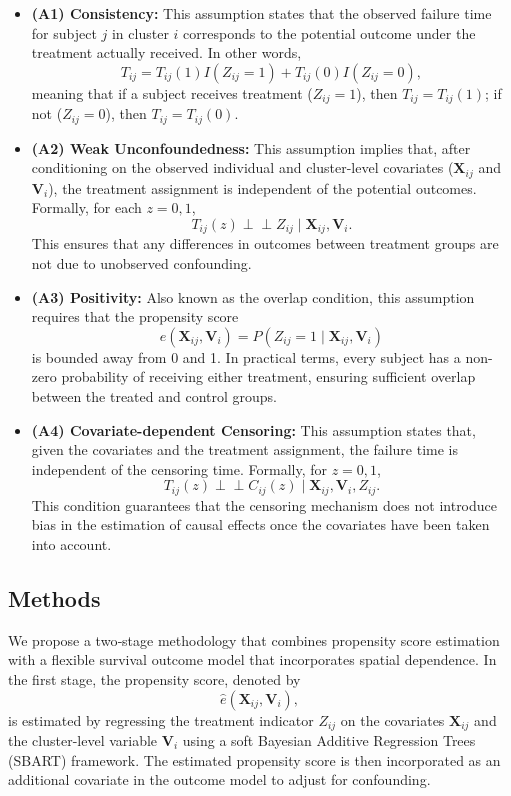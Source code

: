 \documentclass[useAMS,referee]{biom}
\begin{document}
\begin{itemize}
    \item \textbf{(A1) Consistency:} This assumption states that the observed failure time for subject \(j\) in cluster \(i\) corresponds to the potential outcome under the treatment actually received. In other words,
    \[
    T_{ij} = T_{ij}(1)I(Z_{ij}=1) + T_{ij}(0)I(Z_{ij}=0),
    \]
    meaning that if a subject receives treatment (\(Z_{ij}=1\)), then \(T_{ij} = T_{ij}(1)\); if not (\(Z_{ij}=0\)), then \(T_{ij} = T_{ij}(0)\).
    
    \item \textbf{(A2) Weak Unconfoundedness:} This assumption implies that, after conditioning on the observed individual and cluster-level covariates (\(\bm{X}_{ij}\) and \(\bm{V}_i\)), the treatment assignment is independent of the potential outcomes. Formally, for each \(z=0,1\),
    \[
    T_{ij}(z) \perp\!\!\!\perp Z_{ij}\mid \bm{X}_{ij},\bm{V}_i.
    \]
    This ensures that any differences in outcomes between treatment groups are not due to unobserved confounding.
    
    \item \textbf{(A3) Positivity:} Also known as the overlap condition, this assumption requires that the propensity score
    \[
    e(\bm{X}_{ij},\bm{V}_i)=P(Z_{ij}=1\mid \bm{X}_{ij},\bm{V}_i)
    \]
    is bounded away from 0 and 1. In practical terms, every subject has a non-zero probability of receiving either treatment, ensuring sufficient overlap between the treated and control groups.
    
    \item \textbf{(A4) Covariate-dependent Censoring:} This assumption states that, given the covariates and the treatment assignment, the failure time is independent of the censoring time. Formally, for \(z=0,1\),
    \[
    T_{ij}(z) \perp\!\!\!\perp C_{ij}(z)\mid \bm{X}_{ij},\bm{V}_i,Z_{ij}.
    \]
    This condition guarantees that the censoring mechanism does not introduce bias in the estimation of causal effects once the covariates have been taken into account.
\end{itemize}
 

\subsection{Methods}

We propose a two‐stage methodology that combines propensity score estimation with a flexible survival outcome model that incorporates spatial dependence. In the first stage, the propensity score, denoted by 
\[
\hat{e}(\bm{X}_{ij},\bm{V}_i),
\]
is estimated by regressing the treatment indicator \(Z_{ij}\) on the covariates \(\bm{X}_{ij}\) and the cluster-level variable \(\bm{V}_i\) using a soft Bayesian Additive Regression Trees (SBART) framework. The estimated propensity score is then incorporated as an additional covariate in the outcome model to adjust for confounding.
\end{document}
